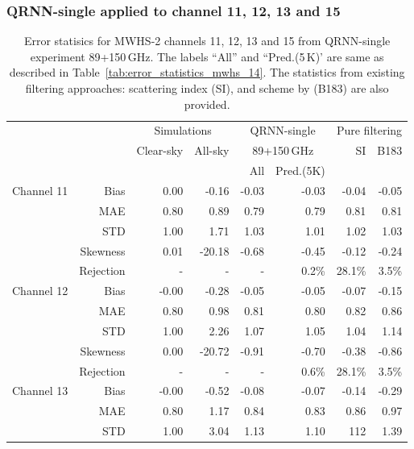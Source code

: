 \documentclass[amt, manuscript]{copernicus}
\begin{document}
\subsubsection{QRNN-single applied to channel 11, 12, 13 and 15}
\label{sec:mwhs_others}
\begin{table}[t]
	\caption{ Error statisics for MWHS-2 channels 11, 12, 13 and 15 from QRNN-single experiment 89+150\,GHz. The labels ``All'' and ``Pred.(5\,K)' are same as described in Table~\ref{tab:error_statistics_mwhs_14}. The statistics from existing filtering approaches: scattering index (SI), and scheme by \citet{buehler:aclou:07} (B183) are also provided.}
	\label{tab:error_statistics_mwhs_others}
	\begin{tabular}{lrrr|rr|rr}
		\tophline
		&&\multicolumn{2}{c|}{Simulations}& \multicolumn{2}{c|}{QRNN-single} & \multicolumn{2}{c}{Pure filtering} \\
		\cline{2-8}
		& &  Clear-sky &   All-sky &  \multicolumn{2}{c|}{89+150\,GHz}    & SI & B183  \\
		&	&		   &			& All & Pred.(5K) &&\\
		\middlehline
		Channel 11  &   Bias      & 0.00 &  -0.16 & -0.03 & -0.03		 &-0.04	& -0.05 \\
				    &	MAE       & 0.80 &   0.89 &  0.79 &  0.79  		 & 0.81	&  0.81 \\
					&	STD       & 1.00 &   1.71 &  1.03 &  1.01 		 & 1.02	&  1.03 \\
					&	Skewness  & 0.01 & -20.18 & -0.68 & -0.45 		 &-0.12 & -0.24 \\
					& Rejection   & -    & -      & -	  & 0.2\%        & 28.1\% & 3.5\%  \\
		\middlehline
		Channel 12  & Bias      & -0.00 &  -0.28 & -0.05 & -0.05		&  -0.07 & -0.15 \\
					& MAE       &  0.80 &   0.98 &  0.81 &  0.80  		&   0.82 &	0.86 \\
					& STD       &  1.00 &   2.26 &  1.07 &  1.05  		&  1.04  &  1.14 \\
					& Skewness  &  0.00 & -20.72 & -0.91 & -0.70  		&  -0.38 & -0.86 \\
					& Rejection & -    & -      & -	  & 0.6\%        & 28.1\% & 3.5\%  \\
		\middlehline
		Channel 13  & Bias      & -0.00 &  -0.52 & -0.08 & -0.07 		& -0.14  & -0.29 \\
					& MAE       &  0.80 &   1.17 &  0.84 &  0.83  		&  0.86  &  0.97 \\
					& STD       &  1.00 &   3.04 &  1.13 &  1.10  		&  112  &	1.39 \\

\end{tabular}
\end{table}
\end{document}
